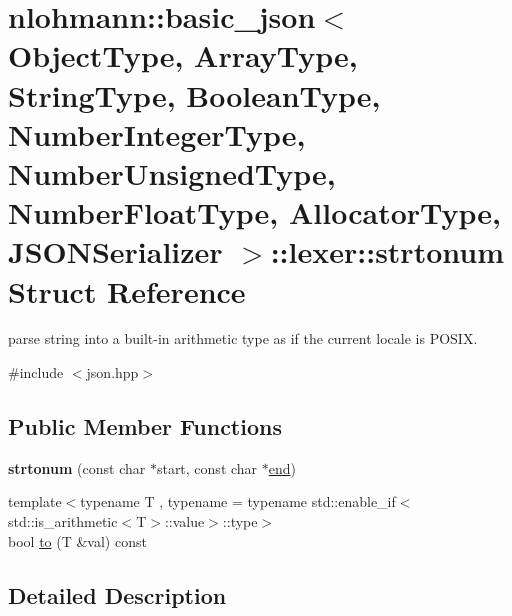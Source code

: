 \hypertarget{structnlohmann_1_1basic__json_1_1lexer_1_1strtonum}{}\section{nlohmann\+::basic\+\_\+json$<$ Object\+Type, Array\+Type, String\+Type, Boolean\+Type, Number\+Integer\+Type, Number\+Unsigned\+Type, Number\+Float\+Type, Allocator\+Type, J\+S\+O\+N\+Serializer $>$\+::lexer\+::strtonum Struct Reference}
\label{structnlohmann_1_1basic__json_1_1lexer_1_1strtonum}


parse string into a built-\/in arithmetic type as if the current locale is P\+O\+S\+IX.  




{\ttfamily \#include $<$json.\+hpp$>$}

\subsection*{Public Member Functions}
\begin{DoxyCompactItemize}
\item 
\mbox{\label{structnlohmann_1_1basic__json_1_1lexer_1_1strtonum_ae065098e24b08ea79a359950190006d8}} 
{\bfseries strtonum} (const char $\ast$start, const char $\ast$\mbox{\hyperlink{classnlohmann_1_1basic__json_a13e032a02a7fd8a93fdddc2fcbc4763c}{end}})
\item 
{\footnotesize template$<$typename T , typename  = typename std\+::enable\+\_\+if$<$std\+::is\+\_\+arithmetic$<$\+T$>$\+::value$>$\+::type$>$ }\\bool \mbox{\hyperlink{structnlohmann_1_1basic__json_1_1lexer_1_1strtonum_af1b3dc99a67a854750437a60a22f4989}{to}} (T \&val) const
\end{DoxyCompactItemize}


\subsection{Detailed Description}
